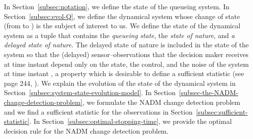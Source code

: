 \documentclass[acmtosn]{acmtrans2m}
\begin{document}
In Section~\ref{subsec:notation}, we define the state of the queueing system. 
In Section~\ref{subsec:evol-Q}, we define the dynamical system whose change 
of state (from  to ) is the subject of interest to us. We define the 
state of the dynamical system as a tuple that contains 
the {\em queueing state}, the {\em state of nature}, and {\em a delayed state
of nature}. The delayed state of nature is included in the state of the 
system so that the (delayed) sensor--observations that the decision maker 
receives at time instant  depend only on the state, the control, and the 
noise of the system at time instant ,
a property which is desirable to define a sufficient statistic
(see page 244, \cite{books.bertsekas00a}).
We explain the evolution of the state
of the dynamical system in Section~\ref{subsec:system-state-evolution-model}.
In Section~\ref{subsec-the-NADM-change-detection-problem}, we formulate
the {\sf NADM} change detection problem and we find a sufficient statistic for the 
observations in Section~\ref{subsec:sufficient-statistic}. In 
Section~\ref{subsec:optimal-stopping-time}, we provide the optimal 
decision rule for the {\sf NADM} change detection problem.
\end{document}
